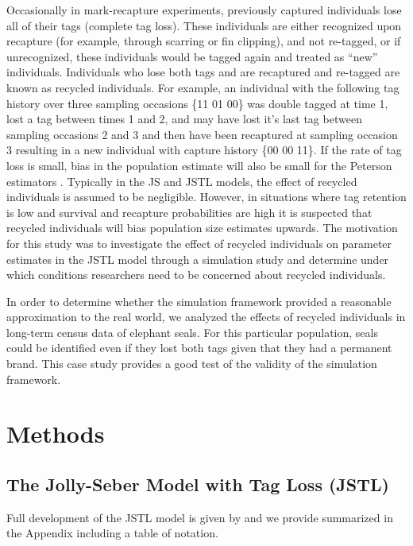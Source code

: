 \documentclass[]{article}
\begin{document}
Occasionally in mark-recapture experiments, previously captured
individuals lose all of their tags (complete tag loss). These
individuals are either recognized upon recapture (for example, through
scarring or fin clipping), and not re-tagged, or if unrecognized, these
individuals would be tagged again and treated as ``new'' individuals.
Individuals who lose both tags and are recaptured and re-tagged are
known as recycled individuals. For example, an individual with the
following tag history over three sampling occasions \{11 01 00\} was
double tagged at time 1, lost a tag between times 1 and 2, and may have
lost it's last tag between sampling occasions 2 and 3 and then have been
recaptured at sampling occasion 3 resulting in a new individual with
capture history \{00 00 11\}. If the rate of tag loss is small, bias in
the population estimate will also be small for the Peterson estimators
\citep{Seber:1981}. Typically in the JS and JSTL models, the
effect of recycled individuals is assumed to be negligible. However, in
situations where tag retention is low and survival and recapture
probabilities are high it is suspected that recycled individuals will
bias population size estimates upwards. The motivation for this study
was to investigate the effect of recycled individuals on parameter
estimates in the JSTL model through a simulation study and determine
under which conditions researchers need to be concerned about recycled
individuals.

In order to determine whether the simulation framework provided a
reasonable approximation to the real world, we analyzed the effects of
recycled individuals in long-term census data of elephant seals. For
this particular population, seals could be identified even if they lost
both tags given that they had a permanent brand. This case study
provides a good test of the validity of the simulation framework.

\section{Methods}\label{methods}

\subsection{The Jolly-Seber Model with Tag Loss
(JSTL)}\label{the-jolly-seber-model-with-tag-loss-jstl}

Full development of the JSTL model is given by \citep{Cowen:2006} and we provide summarized in the Appendix including a table of notation.  
\end{document}
